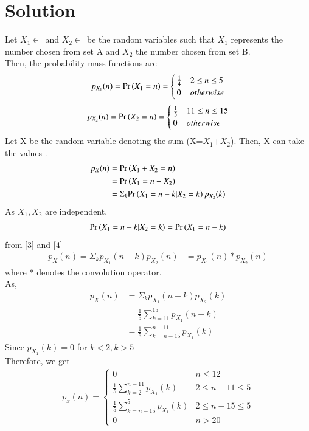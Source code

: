 \documentclass[journal,12pt,twocolumn]{IEEEtran}
\begin{document}
\section{\textbf{Solution}}
Let $X_1\in\,$ and $X_2\in\,$ be the random variables such that $X_1$ represents the number chosen from set A and $X_2$ the number chosen from set B.\\
Then, the probability mass functions are 
\begin{align}
    p_{X_1}(n) = \Pr\left(X_1 = n\right) = 
    \begin{cases}
    \frac{1}{4} & 2 \leq n \leq 5\\
    0 & otherwise
\end{cases}\label{1}
\end{align}
\begin{align}
    p_{X_2}(n) = \Pr\left(X_2 = n\right) = 
    \begin{cases}
    \frac{1}{5} & 11 \leq n \leq 15\\
    0 & otherwise
\end{cases}\label{2}
\end{align}
Let X be the random variable denoting the sum (X=$X_1$+$X_2$). Then, X can take the values .
\begin{align}
     p_X(n)&=\Pr\left(X_1+X_2=n\right)\\
     &=\Pr\left(X_1=n-X_2\right)\\
     &=\Sigma_{k}{\Pr\left(X_1=n-k|X_2=k\right)p_{X_2}(k)}\label{3}
\end{align}
 As $X_1,X_2$ are independent,
\begin{align}
    \Pr\left(X_1=n-k|X_2=k\right)=\Pr\left(X_1=n-k\right)\label{4}
\end{align}
from \eqref{3} and \eqref{4}
\begin{align}
    p_X(n) = \Sigma_{k} p_{X_1}(n-k)p_{X_2}(n)
    &= p_{X_1}(n)*p_{X_2}(n)\label{5}
\end{align}
where * denotes the convolution operator.\\
As,
\begin{align}
    p_X(n) &= \Sigma_{k} p_{X_1}(n-k)p_{X_2}(k)\\
    &= \frac{1}{5} \sum_{k=11}^{15}p_{X_1}(n-k)\\
    &= \frac{1}{5} \sum_{k=n-15}^{n-11} p_{X_1}(k)
\end{align}
Since $p_{X_1}(k)=0$ for $k<2 , k>5$\\
Therefore, we get 
\begin{align}
    p_x(n) = 
    \begin{cases}
    0 & n \leq 12\\
    \frac{1}{5} \sum_{k=2}^{n-11}p_{X_1}(k) & 2 \leq n-11 \leq 5\\
    \frac{1}{5} \sum_{k=n-15}^{5}p_{X_1}(k) & 2 \leq n-15 \leq 5\\
    0 & n>20
    \end{cases}
\end{align}
\end{document}
